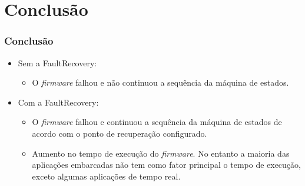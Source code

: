 
\section{Conclusão} \label{Sec:Conclusao}

\begin{frame}
	\frametitle{Conclusão}
	\begin{itemize}
		\item Sem a FaultRecovery:
		\begin{itemize}			
			\item O \textit{firmware} falhou e não continuou a sequência da máquina de estados.
		\end{itemize}
		\item Com a FaultRecovery:
		\begin{itemize}
			\item O \textit{firmware} falhou e continuou a sequência da máquina de estados de acordo com o ponto de recuperação configurado.	
			\item Aumento no tempo de execução do \textit{firmware}. No entanto a maioria das aplicações embarcadas não tem como fator principal o tempo de execução, exceto algumas aplicações de tempo real.
			
		\end{itemize}
	\end{itemize}
\end{frame}

